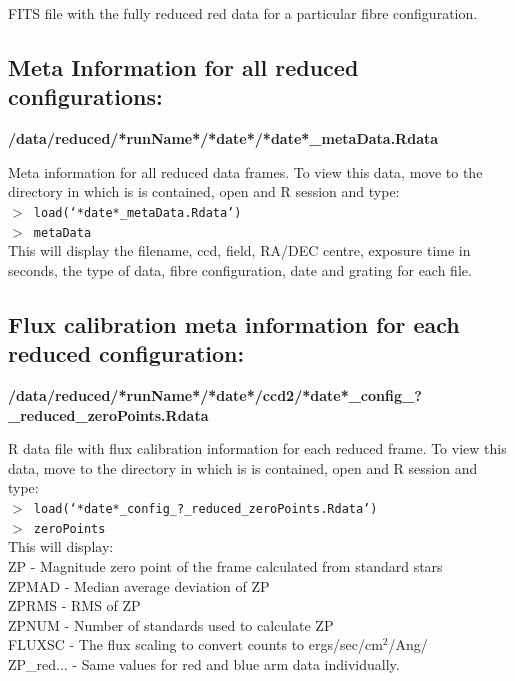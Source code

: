 \documentclass[12pt]{article}
\begin{document}
  FITS file with the fully reduced red data for a particular fibre configuration.
 

\subsection{Meta Information for all reduced configurations:} 
 
 \textbf{/data/reduced/*runName*/*date*/*date*\_metaData.Rdata} 
 
 Meta information for all reduced data frames. To view this data, move to the directory in which is is contained, open and R session and type:\\
 

\hspace{10mm}  \texttt{$>$ load(`*date*\_metaData.Rdata')}\\

\hspace{10mm}  \texttt{$>$ metaData}\\

 This will display the filename, ccd, field, RA/DEC centre, exposure time in seconds, the type of data, fibre configuration, date and grating for each file.  
  
 
 \subsection{Flux calibration meta information for each reduced configuration:} 
  
  \textbf{/data/reduced/*runName*/*date*/ccd2/*date*\_config\_?\_reduced\_zeroPoints.Rdata} 
  
  R data file with flux calibration information for each reduced frame. To view this data, move to the directory in which is is contained, open and R session and type:\\
 

\hspace{10mm}  \texttt{$>$ load(`*date*\_config\_?\_reduced\_zeroPoints.Rdata')}\\

\hspace{10mm}  \texttt{$>$ zeroPoints}\\

This will display:\\

ZP - Magnitude zero point of the frame calculated from standard stars     \\
ZPMAD - Median average deviation of ZP    \\
ZPRMS - RMS of ZP   \\
ZPNUM - Number of standards used to calculate ZP\\
FLUXSC - The flux scaling to convert counts to ergs/sec/cm$^2$/Ang/\\
ZP\_red... - Same values for red and blue arm data individually.  \\
\end{document}
